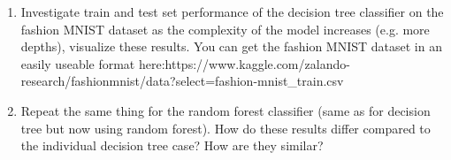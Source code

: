 \documentclass[USenglish,final,authoryear,12pt]{article}
\begin{document}
\begin{enumerate}
	\item Investigate train and test set performance of the decision tree classifier on the fashion MNIST dataset as the complexity of the model increases (e.g. more depths), visualize these results.\newline
	You can get the fashion MNIST dataset in an easily useable format here:\newline https://www.kaggle.com/zalando-research/fashionmnist/data?select=fashion-mnist\_train.csv
	\item Repeat the same thing for the random forest classifier (same as for decision tree but now using random forest). How do these results differ compared to the individual decision tree case? How are they similar?
\end{enumerate}
\end{document}
